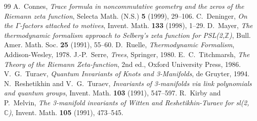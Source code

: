 \documentclass[11pt,a4paper]{amsart}
\begin{document}
\begin{thebibliography}{99}
 A.~Connes, \emph{Trace formula in noncommutative geometry and the zeros of the Riemann zeta function}, Selecta Math. (N.S.) \textbf{5} (1999), 29--106.
 C.~Deninger, \emph{On the \(\Gamma\)-factors attached to motives}, Invent. Math. \textbf{133} (1998), 1--29.
 D.~Mayer, \emph{The thermodynamic formalism approach to Selberg's zeta function for PSL(2,\(\mathbb{Z}\))}, Bull. Amer. Math. Soc. \textbf{25} (1991), 55--60.
 D.~Ruelle, \emph{Thermodynamic Formalism}, Addison-Wesley, 1978.
 J.-P.~Serre, \emph{Trees}, Springer, 1980.
 E.~C.~Titchmarsh, \emph{The Theory of the Riemann Zeta-function}, 2nd ed., Oxford University Press, 1986.
 V.~G.~Turaev, \emph{Quantum Invariants of Knots and 3-Manifolds}, de Gruyter, 1994.
 N.~Reshetikhin and V.~G.~Turaev, \emph{Invariants of 3-manifolds via link polynomials and quantum groups}, Invent. Math. \textbf{103} (1991), 547--597.
 R.~Kirby and P.~Melvin, \emph{The 3-manifold invariants of Witten and Reshetikhin-Turaev for sl(2,\(\mathbb{C}\))}, Invent. Math. \textbf{105} (1991), 473--545.
\end{thebibliography}
\end{document}
